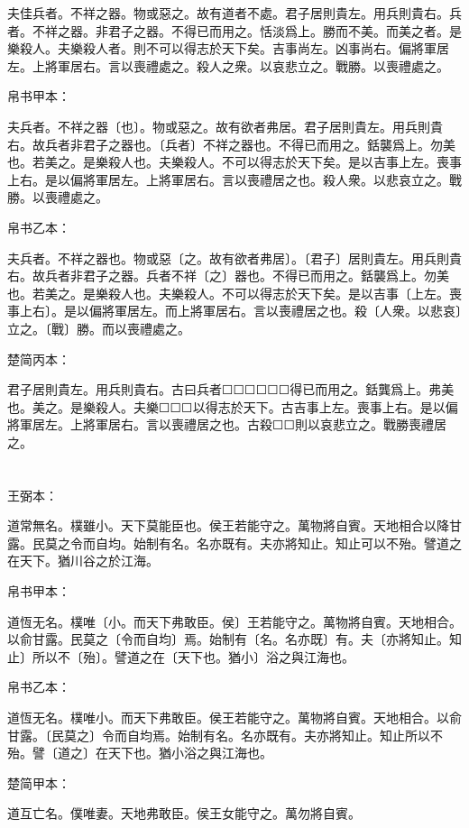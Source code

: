 \documentclass[a5paper]{ctexbook}
\begin{document}
    夫佳兵者。不祥之器。物或惡之。故有道者不處。君子居則貴左。用兵則貴右。兵者。不祥之器。非君子之器。不得已而用之。恬淡爲上。勝而不美。而美之者。是樂殺人。夫樂殺人者。則不可以得志於天下矣。吉事尚左。凶事尚右。偏將軍居左。上將軍居右。言以喪禮處之。殺人之衆。以哀悲立之。戰勝。以喪禮處之。

    
    帛书甲本：

    夫兵者。不祥之器〔也〕。物或惡之。故有欲者弗居。君子居則貴左。用兵則貴右。故兵者非君子之器也。〔兵者〕不祥之器也。不得已而用之。銛襲爲上。勿美也。若美之。是樂殺人也。夫樂殺人。不可以得志於天下矣。是以吉事上左。喪事上右。是以偏將軍居左。上將軍居右。言以喪禮居之也。殺人衆。以悲哀立之。戰勝。以喪禮處之。

    帛书乙本：

    夫兵者。不祥之器也。物或惡〔之。故有欲者弗居〕。〔君子〕居則貴左。用兵則貴右。故兵者非君子之器。兵者不祥〔之〕器也。不得已而用之。銛襲爲上。勿美也。若美之。是樂殺人也。夫樂殺人。不可以得志於天下矣。是以吉事〔上左。喪事上右〕。是以偏將軍居左。而上將軍居右。言以喪禮居之也。殺〔人衆。以悲哀〕立之。〔戰〕勝。而以喪禮處之。

    楚简丙本：

    君子居則貴左。用兵則貴右。古曰兵者☐☐☐☐☐☐得已而用之。銛龔爲上。弗美也。美之。是樂殺人。夫樂☐☐☐以得志於天下。古吉事上左。喪事上右。是以偏將軍居左。上將軍居右。言以喪禮居之也。古殺☐☐則以哀悲立之。戰勝喪禮居之。

    \chapter{}
    王弼本：

    道常無名。樸雖小。天下莫能臣也。侯王若能守之。萬物將自賓。天地相合以降甘露。民莫之令而自均。始制有名。名亦既有。夫亦將知止。知止可以不殆。譬道之在天下。猶川谷之於江海。

    
    帛书甲本：

    道恆无名。樸唯〔小。而天下弗敢臣。侯〕王若能守之。萬物將自賓。天地相合。以俞甘露。民莫之〔令而自均〕焉。始制有〔名。名亦既〕有。夫〔亦將知止。知止〕所以不〔殆〕。譬道之在〔天下也。猶小〕浴之與江海也。

    帛书乙本：

    道恆无名。樸唯小。而天下弗敢臣。侯王若能守之。萬物將自賓。天地相合。以俞甘露。〔民莫之〕令而自均焉。始制有名。名亦既有。夫亦將知止。知止所以不殆。譬〔道之〕在天下也。猶小浴之與江海也。

    楚简甲本：

    道互亡名。僕唯妻。天地弗敢臣。侯王女能守之。萬勿將自賓。
\end{document}
